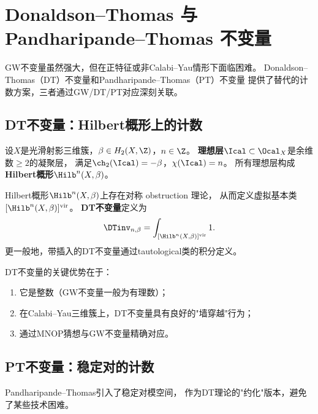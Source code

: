 
\section{Donaldson--Thomas 与 Pandharipande--Thomas 不变量}\label{sec:dt}

GW不变量虽然强大，但在正特征或非Calabi--Yau情形下面临困难。
Donaldson--Thomas（DT）不变量和Pandharipande--Thomas（PT）不变量
提供了替代的计数方案，三者通过GW/DT/PT对应深刻关联。

\subsection{DT不变量：Hilbert概形上的计数}

\begin{definition}[理想层与Hilbert概形]\label{def:hilb}
设$X$是光滑射影三维簇，$\beta \in H_2(X, \Z)$，$n \in \Z$。
\textbf{理想层}$\Ical \subset \Ocal_X$是余维数$\geq 2$的凝聚层，
满足$\ch_2(\Ical) = -\beta$，$\chi(\Ical) = n$。
所有理想层构成\textbf{Hilbert概形}$\Hilb^n(X, \beta)$。
\end{definition}

\begin{theorem}\label{thm:dt}
Hilbert概形$\Hilb^n(X, \beta)$上存在对称 obstruction 理论，
从而定义虚拟基本类$[\Hilb^n(X,\beta)]^{\mathrm{vir}}$。
\textbf{DT不变量}定义为
\[
\DTinv_{n,\beta} = \int_{[\Hilb^n(X,\beta)]^{\mathrm{vir}}} 1.
\]
更一般地，带插入的DT不变量通过tautological类的积分定义。
\end{theorem}

DT不变量的关键优势在于：
\begin{enumerate}[label=(\arabic*)]
\item 它是整数（GW不变量一般为有理数）；
\item 在Calabi--Yau三维簇上，DT不变量具有良好的"墙穿越"行为；
\item 通过MNOP猜想\cite{MNOP2006}与GW不变量精确对应。
\end{enumerate}

\subsection{PT不变量：稳定对的计数}

Pandharipande--Thomas引入了稳定对模空间，
作为DT理论的"约化"版本，避免了某些技术困难。

